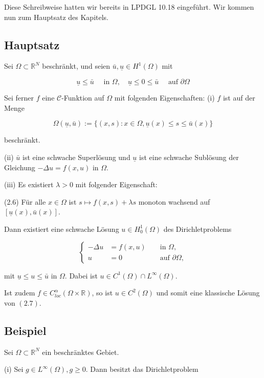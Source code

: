 \documentclass[10pt, letterpaper]{article}
\begin{document}
Diese Schreibweise hatten wir bereits in LPDGL 10.18 eingeführt. Wir kommen nun zum Hauptsatz des Kapitels.

\subsection*{Hauptsatz}

Sei $\Omega \subset \mathbb{R}^{N}$ beschränkt, und seien $\bar{u}, \underline{u} \in H^{1}(\Omega)$ mit

$$
\underline{u} \leq \bar{u} \quad \text { in } \Omega, \quad \underline{u} \leq 0 \leq \bar{u} \quad \text { auf } \partial \Omega
$$

Sei ferner $f$ eine $\mathcal{C}$-Funktion auf $\Omega$ mit folgenden Eigenschaften:
(i) $f$ ist auf der Menge

$$
\Omega(\underline{u}, \bar{u}):=\{(x, s): x \in \Omega, \underline{u}(x) \leq s \leq \bar{u}(x)\}
$$

beschränkt.

(ii) $\bar{u}$ ist eine schwache Superlösung und $\underline{u}$ ist eine schwache Sublösung der Gleichung $-\Delta u=f(x, u)$ in $\Omega$.

(iii) Es existiert $\lambda>0$ mit folgender Eigenschaft:

(2.6) Für alle $x \in \Omega$ ist $s \mapsto f(x, s)+\lambda s$ monoton wachsend auf $[\underline{u}(x), \bar{u}(x)]$.

Dann existiert eine schwache Lösung $u \in H_{0}^{1}(\Omega)$ des Dirichletproblems

$$
\left\{\begin{aligned}
-\Delta u & =f(x, u) & & \text { in } \Omega, \\
u & =0 & & \text { auf } \partial \Omega,
\end{aligned}\right.
$$

mit $\underline{u} \leq u \leq \bar{u}$ in $\Omega$. Dabei ist $u \in C^{1}(\Omega) \cap L^{\infty}(\Omega)$.

Ist zudem $f \in C_{l o c}^{\alpha}(\Omega \times \mathbb{R})$, so ist $u \in C^{2}(\Omega)$ und somit eine klassische Lösung von $(2.7)$.

\subsection*{Beispiel}

Sei $\Omega \subset \mathbb{R}^{N}$ ein beschränktes Gebiet.

(i) Sei $g \in L^{\infty}(\Omega), g \geq 0$. Dann besitzt das Dirichletproblem
\end{document}
